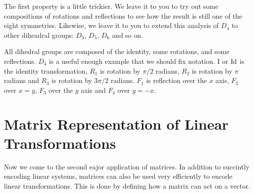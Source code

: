 \documentclass[fleqn]{report}
\begin{document}
The first property is a little trickier. We leave it to you to
try out some compositions of rotations and reflections to see
how the result is still one of the eight symmetries. Likewise,
we leave it to you to extend this analysis of $D_4$ to other
diheadral groups: $D_3$, $D_5$, $D_6$ and so on.

All dihedral groups are composed of the identity, some
rotations, and some reflections. $D_4$ is a useful enough
example that we should fix notation. I or $\mathrm{Id}$ is the
identity transformation, $R_1$ is rotation by $\pi/2$ radians,
$R_2$ is rotation by $\pi $radians and $R_3$ is rotation by
$3\pi/2$ radians. $F_1$ is reflection over the $x$ axis, $F_2$
over $x=y$, $F_3$ over the $y$ axis and $F_4$ over $y=-x$.

\chapter{Matrix Representation of Linear Transformations}
\label{matrix_representation}

Now we come to the second eajor application of matrices. In
addition to succintly encoding linear systems, matrices can
also be used very efficiently to encode linear
transformations. This is done by defining how a matrix can act
on a vector.
\end{document}
